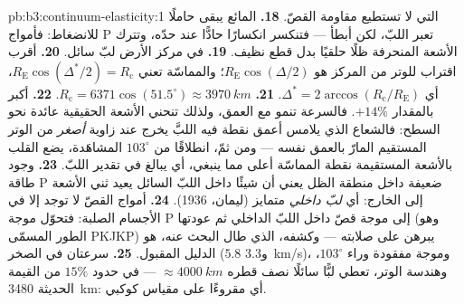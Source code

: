 \begin{solution}{pb:b3:continuum-elasticity:1}
التي لا تستطيع مقاومة القصّ.
\textbf{18.} المائع يبقى حاملًا للانضغاط: فأمواج P تعبر
اللبّ، لكن أبطأ --- فتنكسر انكسارًا حادًّا عند حدّه، وتترك
الأشعة المنحرفة ظلًا حلقيًا بدل قطع نظيف.
\textbf{19.} في مركز الأرض لبّ سائل.
\textbf{20.} أقرب اقتراب للوتر من المركز هو
$R_{\text{E}}\cos(\Delta/2)$؛ والمماسّة تعني
$R_{\text{E}}\cos(\Delta^*/2) = R_{\text{c}}$، أي $\Delta^* =
2\arccos(R_{\text{c}}/R_{\text{E}})$.
\textbf{21.} $R_{\text{c}} = 6371\cos(51.5^\circ) \approx
\qty{3970}{km}$.
\textbf{22.} أكبر بالمقدار $+14\%$. فالسرعة تنمو مع العمق، ولذلك
تنحني الأشعة الحقيقية عائدة نحو السطح: فالشعاع الذي يلامس أعمق
نقطة فيه اللبَّ يخرج عند زاوية \emph{أصغر} من الوتر المستقيم
المارّ بالعمق نفسه --- ومن ثمّ، انطلاقًا من $103^\circ$ المشاهَدة،
يضع القلب بالأشعة المستقيمة نقطة المماسّة أعلى مما ينبغي، أي
يبالغ في تقدير اللبّ.
\textbf{23.} وجود طاقة P ضعيفة داخل منطقة الظل يعني أن شيئًا
داخل اللبّ السائل يعيد ثني الأشعة إلى الخارج: أي \emph{لبّ
داخلي} متمايز (ليمان، 1936).
\textbf{24.} أمواج القصّ لا توجد إلا في الأجسام الصلبة: فتحوّل
موجة P إلى موجة قصّ داخل اللبّ الداخلي ثم عودتها (وهو الطور
المسمّى PKJKP) يبرهن على صلابته --- وكشفه، الذي طال البحث عنه،
هو الدليل المقبول.
\textbf{25.} سرعتان في الصخر ($5.8$ و\qty{3.3}{km/s})، وموجة
مفقودة وراء $103^\circ$، وهندسة الوتر، تعطي لبًّا سائلًا
نصف قطره $\approx\qty{4000}{km}$ --- في حدود $15\%$ من القيمة
الحديثة \qty{3480}{km}: أي  مقروءًا على مقياس كوكبي.
\end{solution}
